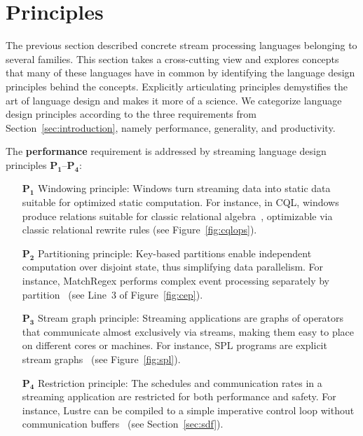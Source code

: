 \section{Principles}\label{sec:principles}

The previous section described concrete stream processing languages
belonging to several families. This section takes a cross-cutting view
and explores concepts that many of these languages have in common by
identifying the language design principles behind the concepts.
Explicitly articulating principles demystifies the art of language
design and makes it more of a science. We categorize language design
principles according to the three requirements from
Section~\ref{sec:introduction}, namely performance, generality, and
productivity.

The \textbf{performance} requirement is addressed by streaming
language design principles $\mathbf{P_1}$--$\mathbf{P_4}$:
\begin{itemize}
  \item[$\mathbf{P_1}$] Windowing principle: Windows turn streaming
    data into static data suitable for optimized static computation.
    For instance, in CQL, windows produce relations suitable for
    classic relational algebra~\cite{arasu_babu_widom_2006},
    optimizable via classic relational rewrite rules (see
    Figure~\ref{fig:cqlops}).
  \item[$\mathbf{P_2}$] Partitioning principle: Key-based partitions
    enable independent computation over disjoint state, thus
    simplifying data parallelism. For instance, MatchRegex performs
    complex event processing separately by
    partition~\cite{hirzel_2012} (see Line~3 of Figure~\ref{fig:cep}).
  \item[$\mathbf{P_3}$] Stream graph principle: Streaming
    applications are graphs of operators that communicate almost
    exclusively via streams, making them easy to place on different
    cores or machines. For instance, SPL programs are explicit stream
    graphs~\cite{hirzel_schneider_gedik_2017} (see
    Figure~\ref{fig:spl}).
  \item[$\mathbf{P_4}$] Restriction principle: The schedules and
    communication rates in a streaming application are restricted for
    both performance and safety. For instance, Lustre can be compiled
    to a simple imperative control loop without communication
    buffers~\cite{lustre_1987} (see Section~\ref{sec:sdf}).
\end{itemize}

